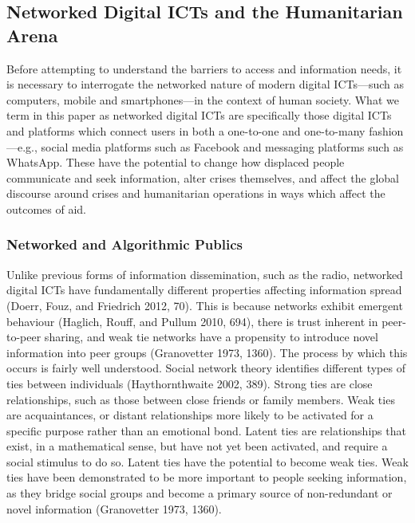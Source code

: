 \documentclass[
]{article}
\begin{document}
\hypertarget{networked-digital-icts-and-the-humanitarian-arena}{%
\subsection{Networked Digital ICTs and the Humanitarian
Arena}\label{networked-digital-icts-and-the-humanitarian-arena}}

Before attempting to understand the barriers to access and information
needs, it is necessary to interrogate the networked nature of modern
digital ICTs---such as computers, mobile and smartphones---in the
context of human society. What we term in this paper as networked
digital ICTs are specifically those digital ICTs and platforms which
connect users in both a one-to-one and one-to-many fashion---e.g.,
social media platforms such as Facebook and messaging platforms such as
WhatsApp. These have the potential to change how displaced people
communicate and seek information, alter crises themselves, and affect
the global discourse around crises and humanitarian operations in ways
which affect the outcomes of aid.

\hypertarget{networked-and-algorithmic-publics}{%
\subsubsection{Networked and Algorithmic
Publics}\label{networked-and-algorithmic-publics}}

Unlike previous forms of information dissemination, such as the radio,
networked digital ICTs have fundamentally different properties affecting
information spread (Doerr, Fouz, and Friedrich 2012, 70). This is
because networks exhibit emergent behaviour (Haglich, Rouff, and Pullum
2010, 694), there is trust inherent in peer-to-peer sharing, and weak
tie networks have a propensity to introduce novel information into peer
groups (Granovetter 1973, 1360). The process by which this occurs is
fairly well understood. Social network theory identifies different types
of ties between individuals (Haythornthwaite 2002, 389). Strong ties are
close relationships, such as those between close friends or family
members. Weak ties are acquaintances, or distant relationships more
likely to be activated for a specific purpose rather than an emotional
bond. Latent ties are relationships that exist, in a mathematical sense,
but have not yet been activated, and require a social stimulus to do so.
Latent ties have the potential to become weak ties. Weak ties have been
demonstrated to be more important to people seeking information, as they
bridge social groups and become a primary source of non-redundant or
novel information (Granovetter 1973, 1360).
\end{document}
